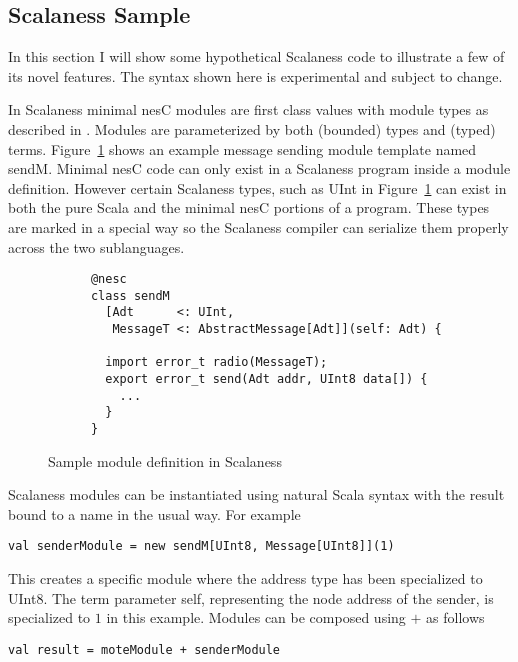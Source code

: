 \documentclass{article}
\begin{document}
\subsection{Scalaness Sample}

In this section I will show some hypothetical Scalaness code to illustrate a few of its novel
features. The syntax shown here is experimental and subject to change.

In Scalaness minimal nesC modules are first class values with module types as described in
\cite{nesT}. Modules are parameterized by both (bounded) types and (typed) terms.
Figure~\ref{fig:module-definition} shows an example message sending module template named sendM.
Minimal nesC code can only exist in a Scalaness program inside a module definition. However
certain Scalaness types, such as UInt in Figure~\ref{fig:module-definition} can exist in both
the pure Scala and the minimal nesC portions of a program. These types are marked in a special
way so the Scalaness compiler can serialize them properly across the two sublanguages.

\begin{figure}[htbp]
  \centering
  \begin{bigbox}
    \begin{lstlisting}
      @nesc
      class sendM
        [Adt      <: UInt,
         MessageT <: AbstractMessage[Adt]](self: Adt) {

        import error_t radio(MessageT);
        export error_t send(Adt addr, UInt8 data[]) {
          ...
        }
      }
    \end{lstlisting}
  \end{bigbox}
  \caption{Sample module definition in Scalaness}
  \label{fig:module-definition}
\end{figure}

Scalaness modules can be instantiated using natural Scala syntax with the result bound to a name
in the usual way. For example
\begin{lstlisting}
val senderModule = new sendM[UInt8, Message[UInt8]](1)
\end{lstlisting}

This creates a specific module where the address type has been specialized to UInt8. The term
parameter self, representing the node address of the sender, is specialized to $1$ in this
example. Modules can be composed using $+$ as follows
\begin{lstlisting}
val result = moteModule + senderModule
\end{lstlisting}
\end{document}
